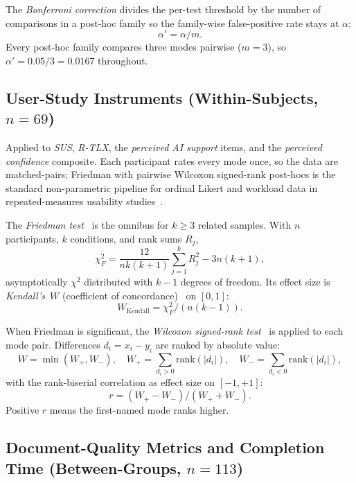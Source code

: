The \emph{Bonferroni correction} divides the per-test threshold by the number of comparisons in a post-hoc family so the family-wise false-positive rate stays at $\alpha$:
\begin{equation}
\alpha' = \alpha / m.
\end{equation}
Every post-hoc family compares three modes pairwise ($m = 3$), so $\alpha' = 0.05 / 3 = 0.0167$ throughout.

\subsection{User-Study Instruments (Within-Subjects, $n = 69$)}

Applied to \textit{SUS}, \textit{R-TLX}, the \textit{perceived AI support} items, and the \textit{perceived confidence} composite. Each participant rates every mode once, so the data are matched-pairs; Friedman with pairwise Wilcoxon signed-rank post-hocs is the standard non-parametric pipeline for ordinal Likert and workload data in repeated-measures usability studies~\cite{SauroLewis2016}.

The \emph{Friedman test}~\cite{Friedman1937} is the omnibus for $k \geq 3$ related samples. With $n$ participants, $k$ conditions, and rank sums $R_j$,
\begin{equation}
\chi^2_F = \frac{12}{n k (k+1)} \sum_{j=1}^{k} R_j^2 - 3 n (k+1),
\end{equation}
asymptotically $\chi^2$ distributed with $k - 1$ degrees of freedom. Its effect size is \emph{Kendall's~$W$} (coefficient of concordance)~\cite{Kendall1939} on $[0, 1]$:
\begin{equation}
W_{\mathrm{Kendall}} = \chi^2_F / (n (k - 1)).
\end{equation}

When Friedman is significant, the \emph{Wilcoxon signed-rank test}~\cite{Wilcoxon1945} is applied to each mode pair. Differences $d_i = x_i - y_i$ are ranked by absolute value:
\begin{equation}
W = \min(W_+, W_-),
\quad W_+ = \!\!\!\sum_{d_i > 0}\!\! \mathrm{rank}(|d_i|), \quad
W_- = \!\!\!\sum_{d_i < 0}\!\! \mathrm{rank}(|d_i|),
\end{equation}
with the rank-biserial correlation as effect size on $[-1, +1]$:
\begin{equation}
r = (W_+ - W_-) / (W_+ + W_-).
\end{equation}
Positive $r$ means the first-named mode ranks higher.

\subsection{Document-Quality Metrics and Completion Time (Between-Groups, $n = 113$)}

